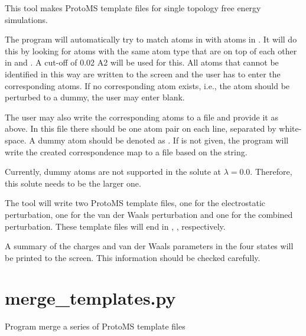 \documentclass[letterpaper,10pt,english]{sphinxmanual}
\begin{document}
This tool makes ProtoMS template files for single topology free energy simulations.

The program will automatically try to match atoms in  with atoms in . It will do this by looking for atoms with the same atom type that are on top of each other in  and . A cut-off of 0.02 A2 will be used for this. All atoms that cannot be identified in this way are written to the screen and the user has to enter the corresponding atoms. If no corresponding atom exists, i.e., the atom should be perturbed to a dummy, the user may enter blank.

The user may also write the corresponding atoms to a file and provide it as  above. In this file there should be one atom pair on each line, separated by white-space. A dummy atom should be denoted as . If  is not given, the program will write the created correspondence map to a file based on the  string.

Currently, dummy atoms are not supported in the solute at \(\lambda=0.0\). Therefore, this solute needs to be the larger one.

The tool will write two ProtoMS template files, one for the electrostatic perturbation, one for the van der Waals perturbation and one for the combined perturbation. These template files will end in , ,  respectively.

A summary of the charges and van der Waals parameters in the four states will be printed to the screen. This information should be checked carefully.


\section{merge\_templates.py}
\label{\detokenize{tools:merge-templates-py}}

Program merge a series of ProtoMS template files


%
\begin{sphinxVerbatim}[commandchars=\\\{\}]
  \PYG{p}{[}\PYG{p}{]} \PYG{p}{[}  \PYG{p}{[} \PYG{p}{]}\PYG{p}{]} \PYG{p}{[} \PYG{p}{]}
\end{sphinxVerbatim}
\end{document}
